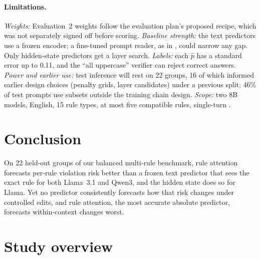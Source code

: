 \documentclass{article}
\newcommand{\phat}{\hat{p}}
\begin{document}
\paragraph{Limitations.} \emph{Weights:} Evaluation~2 weights follow the evaluation plan's proposed recipe, which was not separately signed off before scoring. \emph{Baseline strength:} the text predictors use a frozen encoder; a fine-tuned prompt reader,
as in \citet{ashok2025predict}, could narrow any gap. Only hidden-state predictors get a layer search. \emph{Labels:} each $\phat$ has a standard error up to 0.11, and the ``all uppercase'' verifier can reject correct answers.
\emph{Power and earlier use:} test inference will rest on 22 groups, 16 of which informed earlier design choices
(penalty grids, layer candidates) under a previous split; 46\% of test prompts use subsets outside the training chain
design. \emph{Scope:} two 8B models, English, 15 rule types, at most five compatible rules, single-turn \citep{wallace2024hierarchy,sirdeshmukh2025multichallenge}.


\section{Conclusion}
\label{sec:conclusion}

On 22 held-out groups of our balanced multi-rule benchmark, rule attention forecasts per-rule violation
risk better than a frozen text predictor that sees the exact rule for both Llama~3.1 and Qwen3, and the hidden state
does so for Llama. Yet no predictor consistently forecasts how that risk changes under controlled edits, and rule
attention, the most accurate absolute predictor, forecasts within-context changes worst.\label{end:main}




\clearpage
\appendix

\section{Study overview}
\label{app:overview}
\end{document}
